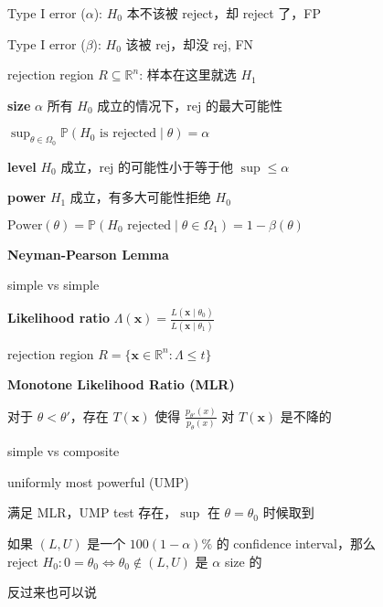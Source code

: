 \documentclass[9pt,landscape]{article}
\begin{document}
\begin{multicols}{3}
Type I error ($\alpha$): $H_0$ 本不该被 reject，却 reject 了，FP

Type I error ($\beta$): $H_0$ 该被 rej，却没 rej, FN

rejection region $R\subseteq \mathbb{R}^n$: 样本在这里就选 $H_1$

\textbf{size} $\alpha$ 所有 $H_0$ 成立的情况下，rej 的最大可能性

$\sup_{\theta\in\Omega_0}\mathbb{P}(H_0 \text{ is rejected}\mid\theta)=\alpha$

\textbf{level} $H_0$ 成立，rej 的可能性小于等于他 $\sup\le\alpha$

\textbf{power} $H_1$ 成立，有多大可能性拒绝 $H_0$

$\mathrm{Power}(\theta)=\mathbb{P}(H_0\text{ rejected}\mid\theta\in\Omega_1)=1-\beta(\theta)$

\textbf{Neyman-Pearson Lemma}

simple vs simple

\textbf{Likelihood ratio} $\Lambda(\boldsymbol{x})=\frac{L(\boldsymbol{x}\mid\theta_0)}{L(\boldsymbol{x}\mid\theta_1)}$

rejection region $R = \{\boldsymbol{x}\in\mathbb{R}^n: \Lambda\le t\}$

\textbf{Monotone Likelihood Ratio (MLR)}

对于 $\theta<\theta'$，存在 $T(\boldsymbol{x})$ 使得 $\frac{p_{\theta'}(x)}{p_\theta(x)}$ 对 $T(\boldsymbol{x})$ 是不降的

simple vs composite

uniformly most powerful (UMP)

满足 MLR，UMP test 存在，$\sup$ 在 $\theta=\theta_0$ 时候取到

如果 $(L, U)$ 是一个 $100(1-\alpha)\%$ 的 confidence interval，那么 $\text{reject }H_0: 0=\theta_0\Leftrightarrow\theta_0\notin(L, U)$ 是 $\alpha$ size 的

反过来也可以说

\end{multicols}
\end{document}
